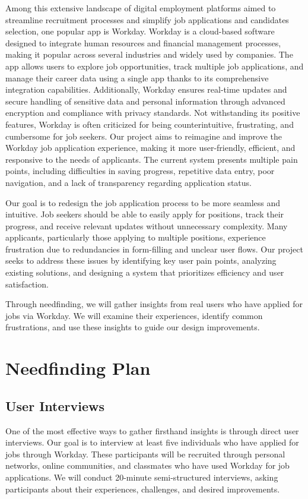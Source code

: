 \documentclass[
	letterpaper, %
]{jdf}
\begin{document}
\begin{sloppypar}
Among this extensive landscape of digital employment platforms aimed to streamline recruitment processes and simplify job applications and candidates selection, one popular app is Workday. Workday is a cloud-based software designed to integrate human resources and financial management processes, making it popular across several industries and widely used by companies. The app allows users to explore job opportunities, track multiple job applications, and manage their career data using a single app thanks to its comprehensive integration capabilities. Additionally, Workday ensures real-time updates and secure handling of sensitive data and personal information through advanced encryption and compliance with privacy standards. Not withstanding its positive features, Workday is often criticized for being counterintuitive, frustrating, and cumbersome for job seekers. Our project aims to reimagine and improve the Workday job application experience, making it more user-friendly, efficient, and responsive to the needs of applicants. The current system presents multiple pain points, including difficulties in saving progress, repetitive data entry, poor navigation, and a lack of transparency regarding application status.

Our goal is to redesign the job application process to be more seamless and intuitive. Job seekers should be able to easily apply for positions, track their progress, and receive relevant updates without unnecessary complexity. Many applicants, particularly those applying to multiple positions, experience frustration due to redundancies in form-filling and unclear user flows. Our project seeks to address these issues by identifying key user pain points, analyzing existing solutions, and designing a system that prioritizes efficiency and user satisfaction.

Through needfinding, we will gather insights from real users who have applied for jobs via Workday. We will examine their experiences, identify common frustrations, and use these insights to guide our design improvements. 

\newpage

\section{Needfinding Plan}
\subsection {User Interviews}
One of the most effective ways to gather firsthand insights is through direct user interviews. Our goal is to interview at least five individuals who have applied for jobs through Workday. These participants will be recruited through personal networks, online communities, and classmates who have used Workday for job applications. We will conduct 20-minute semi-structured interviews, asking participants about their experiences, challenges, and desired improvements.


\end{sloppypar}
\end{document}
